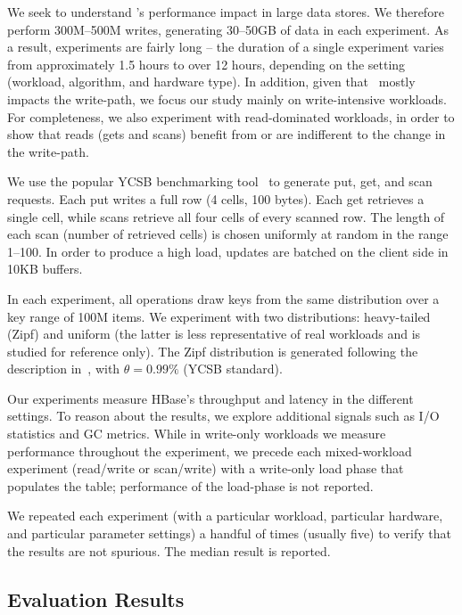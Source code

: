 We seek to understand \sys's performance impact in large  data stores. 
We therefore perform 300M--500M writes, generating 30--50GB of data in each experiment. 
As a result, experiments are fairly long -- the duration of 
a single experiment  varies from approximately 1.5 hours to over 12 hours, 
depending on the setting (workload, algorithm, and hardware type).
In addition, given that \sys\ mostly impacts the write-path, we focus our study mainly on write-intensive workloads. 
For completeness,
we also experiment with read-dominated workloads, in order to show that reads (gets and scans) benefit from or are 
indifferent to the change in the write-path. 


We use the popular YCSB benchmarking tool~\cite{Cooper:2010:BCS:1807128.1807152} to generate 
put, get, and scan requests. Each put writes a full row (4 cells, 100 bytes).
Each get retrieves a single cell, while scans retrieve all four cells of every scanned row. 
The length of each scan (number of retrieved cells) is chosen uniformly at random in the range 1--100.
In order to produce a high load, updates are batched on the client side in 10KB buffers. 

In each experiment, all operations draw keys from the same distribution over a key range
of 100M items. We experiment with two distributions: heavy-tailed (Zipf) and uniform (the latter 
is less representative of real workloads and is studied for reference only). The Zipf distribution 
is generated following the description in~\cite{Gray:1994:QGB:191839.191886}, with $\theta=0.99\%$ 
(YCSB standard).

Our experiments measure HBase's throughput and latency in the different settings. 
To reason about the results, we explore additional signals such as I/O statistics and 
GC metrics.
%
While in write-only workloads we measure performance throughout the experiment,
we precede each mixed-workload experiment (read/write or scan/write) with a write-only
load phase that populates the table; performance of the load-phase is not reported.

We repeated each experiment (with a particular workload, particular hardware, and 
particular parameter settings) a handful 
of times (usually five) to verify that the results are not spurious. The median result is reported. 

\subsection{Evaluation Results}
\label{ssec:results}

